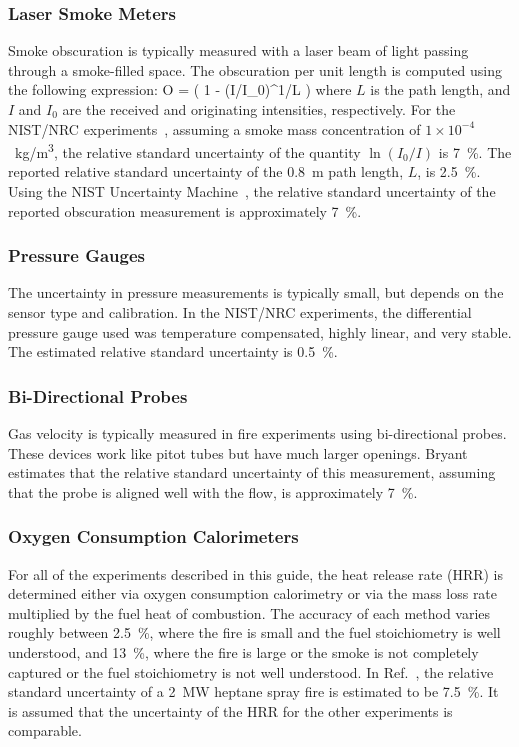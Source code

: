 \subsubsection{Laser Smoke Meters}

Smoke obscuration is typically measured with a laser beam of light passing through a smoke-filled space. The obscuration per unit length is computed using the following expression:
\be
   O = \left( 1 - (I/I_0)^{1/L} \right) 
\ee
where $L$ is the path length, and $I$ and $I_0$ are the received and originating intensities, respectively. For the NIST/NRC experiments~\cite{Hamins:SP1013-1}, assuming a smoke mass concentration of $1 \times 10^{-4}$~\unit{kg/m^3}, the relative standard uncertainty of the quantity $\ln(I_0/I)$ is 7~\%. The reported relative standard uncertainty of the 0.8~m path length, $L$, is 2.5~\%. Using the NIST Uncertainty Machine~\cite{NIST_Uncertainty_Machine}, the relative standard uncertainty of the reported obscuration measurement is approximately 7~\%.


\subsubsection{Pressure Gauges}

The uncertainty in pressure measurements is typically small, but depends on the sensor type and calibration. In the NIST/NRC experiments, the differential pressure gauge used was temperature compensated, highly linear, and very stable. The estimated relative standard uncertainty is 0.5~\%.

\subsubsection{Bi-Directional Probes}

Gas velocity is typically measured in fire experiments using bi-directional probes. These devices work like pitot tubes but have much larger openings. Bryant~\cite{Bryant:FSJ2009} estimates that the relative standard uncertainty of this measurement, assuming that the probe is aligned well with the flow, is approximately 7~\%.

\subsubsection{Oxygen Consumption Calorimeters}

For all of the experiments described in this guide, the heat release rate (HRR) is determined either via oxygen consumption calorimetry or via the mass loss rate multiplied by the fuel heat of combustion. The accuracy of each method varies roughly between 2.5~\%, where the fire is small and the fuel stoichiometry is well understood, and 13~\%, where the fire is large or the smoke is not completely captured or the fuel stoichiometry is not well understood. In Ref.~\cite{Hamins:SP1013-1}, the relative standard uncertainty of a 2~MW heptane spray fire is estimated to be 7.5~\%. It is assumed that the uncertainty of the HRR for the other experiments is comparable.

